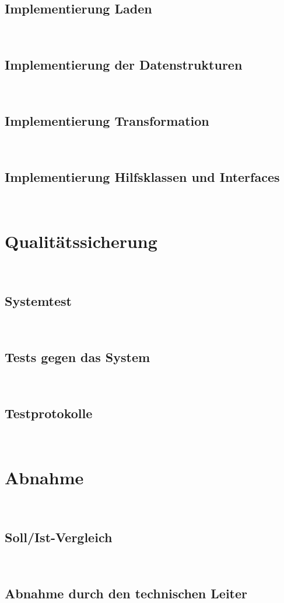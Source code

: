 \documentclass[12pt,toc=sectionentrywithoutdots, headheight=44pt, headings=optiontoheadandtoc]{scrartcl}
\begin{document}
\subsection{Implementierung Laden}
\blindtext\

\subsection{Implementierung der Datenstrukturen}
\blindtext\

\subsection{Implementierung Transformation}
\blindtext\

\subsection{Implementierung Hilfsklassen und Interfaces}
\blindtext\

\section{Qualitätssicherung}
\blindtext\

\subsection{Systemtest}
\blindtext\

\subsection{Tests gegen das System}
\blindtext\

\subsection{Testprotokolle}
\blindtext\

\section{Abnahme}
\blindtext\

\subsection{Soll/Ist-Vergleich}
\blindtext\

\subsection{Abnahme durch den technischen Leiter}
\blindtext\
\end{document}

